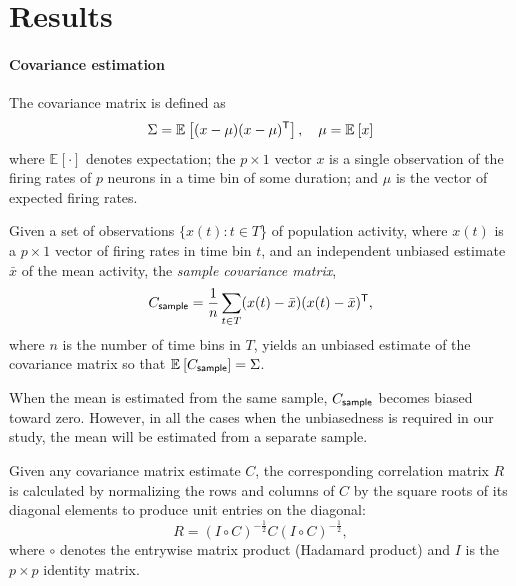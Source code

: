 \documentclass[10pt]{article}
\newcommand{\T}{{\sf T}}
\newcommand{\E}[2][]{\mathbb E_{#1}\left[ #2\right]}    %
\begin{document}
\section*{Results}
\paragraph{Covariance estimation}
The covariance matrix is defined as
\begin{equation}\label{eq:true-covariance}
    \Sigma = \E{(x-\mu)(x-\mu)^\T},\quad \mu = \E{x}
\end{equation}
where $\E{\cdot}$ denotes expectation; the $p\times 1$ vector $x$ is a single observation of the firing rates of $p$ neurons in a time bin of some duration; and $\mu$ is the vector of expected firing rates. 

Given a set of observations $\{x(t): t\in T$\} of population activity, where $x(t)$ is a $p\times 1$ vector of firing rates in time bin $t$, and an independent unbiased estimate $\bar x$ of the mean activity, the \emph{sample covariance matrix},
\begin{equation}\label{eq:sample}
	C_{\sf sample} = \frac 1 n \sum\limits_{t\in T} (x(t)-\bar x)(x(t)-\bar x)^\T,
\end{equation}
where $n$ is the number of time bins in $T$, yields an unbiased estimate of the covariance matrix so that $\E{C_{\sf sample}}=\Sigma$.

When the mean is estimated from the same sample, $C_{\sf sample}$ becomes biased toward zero.  However, in all the cases when the unbiasedness is required in our study, the mean will be estimated from a separate sample.

Given any covariance matrix estimate $C$, the corresponding correlation matrix $R$ is calculated by normalizing the rows and columns of $C$ by the square roots of its diagonal elements to produce unit entries on the diagonal:
\begin{equation}\label{eq:precision}
    R = \left(I\circ C\right)^{-\frac 1 2} C \left(I\circ C\right)^{-\frac 1 2},
\end{equation}
where $\circ$ denotes the entrywise matrix product (Hadamard product) and $I$ is the $p\times p$ identity matrix. 
\end{document}
